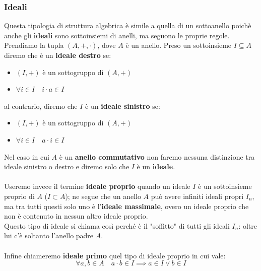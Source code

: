 \documentclass[11pt]{article}
\begin{document}
\subsubsection{Ideali}
Questa tipologia di struttura algebrica è simile a quella di un sottoanello poichè
anche gli \textbf{ideali} sono sottoinsiemi di anelli, ma seguono le proprie regole. \\
Prendiamo la tupla \( (A, +, \cdot) \), dove \(A\) è un anello. Preso un sottoinsieme 
\(I \subseteq A\) diremo che è un \textbf{ideale destro} se:

\begin{itemize}
  \item \( (I, +) \) è un sottogruppo di \( (A, +) \)
  \item \( \forall i \in I \quad i \cdot a \in I \)
\end{itemize}

al contrario, diremo che \(I\) è un \textbf{ideale sinistro} se:

\begin{itemize}
  \item \( (I, +) \) è un sottogruppo di \( (A, +) \)
  \item \( \forall i \in I \quad a \cdot i \in I \)
\end{itemize}

Nel caso in cui \(A\) è un \textbf{anello commutativo} non faremo nessuna distinzione
tra ideale sinistro o destro e diremo solo che \(I\) è un \textbf{ideale}.
\\
\\
Useremo invece il termine \textbf{ideale proprio} quando un ideale \(I\) è un
sottoinsieme proprio di \(A\) (\( I \subset A\)); ne segue che un anello \(A\) può avere
infiniti ideali propri \(I_n\), ma tra tutti questi solo uno è l'\textbf{ideale massimale},
overo un ideale proprio che non è contenuto in nessun altro ideale proprio. \\
Questo tipo di ideale si chiama così perché è il "soffitto" di tutti gli ideali \(I_n\):
oltre lui c'è soltanto l'anello padre \(A\).
\\
\\
Infine chiameremo \textbf{ideale primo} quel tipo di ideale proprio in cui vale:
\[ \forall a,b \in A \quad a \cdot b \in I \implies a \in I \lor b \in I\]
\end{document}
